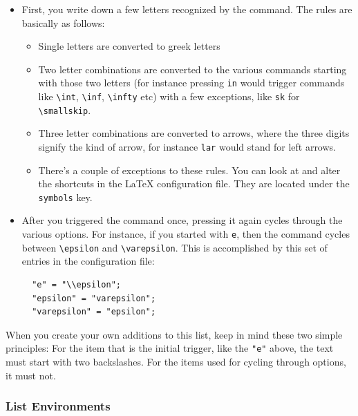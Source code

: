 \documentclass[11pt, x11names]{article}
\begin{document}
\begin{itemize}

  \item First, you write down a few letters recognized by the command. The rules are basically as follows:

  \begin{itemize}

    \item Single letters are converted to greek letters

    \item Two letter combinations are converted to the various commands starting with those two letters (for instance pressing \texttt{in} would trigger commands like \texttt{\textbackslash{}int}, \texttt{\textbackslash{}inf}, \texttt{\textbackslash{}infty} etc) with a few exceptions, like \texttt{sk} for \texttt{\textbackslash{}smallskip}.

    \item Three letter combinations are converted to arrows, where the three digits signify the kind of arrow, for instance \texttt{lar} would stand for left arrows.

    \item There's a couple of exceptions to these rules. You can look at and alter the shortcuts in the LaTeX configuration file. They are located under the \texttt{symbols} key.

  \end{itemize}

  \item After you triggered the command once, pressing it again cycles through the various options. For instance, if you started with \texttt{e}, then the command cycles between \texttt{\textbackslash{}epsilon} and \texttt{\textbackslash{}varepsilon}. This is accomplished by this set of entries in the configuration file:

  \begin{verbatim}
  "e" = "\\epsilon";
  "epsilon" = "varepsilon";
  "varepsilon" = "epsilon";
  \end{verbatim}
\end{itemize}

When you create your own additions to this list, keep in mind these two simple principles: For the item that is the initial trigger, like the \texttt{"e"} above, the text must start with two backslashes. For the items used for cycling through options, it must not.

\subsubsection{List Environments}
\end{document}
